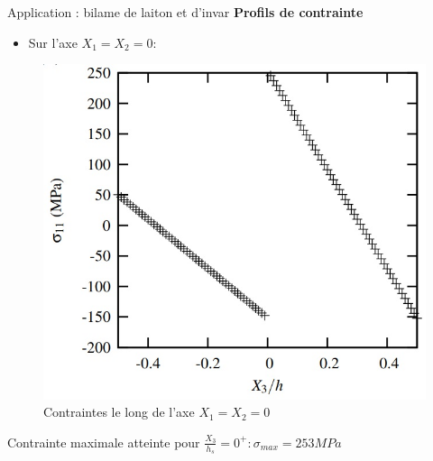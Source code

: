 \begin{frame}{Application : bilame de laiton et d'invar}
    \textbf{\Large{Profils de contrainte}}
    
    \begin{itemize}
        \item Sur l'axe $X_1=X_2=0$:
    \end{itemize}
    \begin{figure}
        \centering
        \includegraphics[scale=0.5]{imgs/graph3.jpg}
        \caption{Contraintes le long de l'axe $X_1=X_2=0$}
    \end{figure}
    Contrainte maximale atteinte pour $\frac{X_3}{h_s} = 0^+ : \sigma_{max} = 253 MPa$
\end{frame}